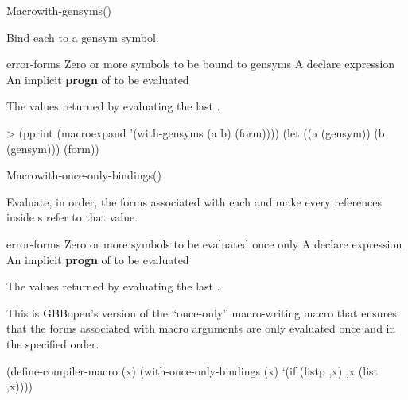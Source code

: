\documentclass[10pt,twoside,english,pdftex]{article}
\begin{document}
\begin{functiondoc}{Macro}{with-gensyms}{(\superstar{})
    \superstar{}
    \superstar{}
    \returns{} \superstar{}}
\fnsyntax

\fnpurpose Bind each  to a gensym symbol.

\fnpackage {}

\fnmodule {}

\fnargs
\begin{args}{error-forms}
\arg[symbols] Zero or more symbols to be bound to gensyms
\arg[declaration] A declare expression
\arg[forms] An implicit \textbf{progn} of  to be evaluated
\end{args}

\fnreturns The values returned by evaluating the last .

\fnexamples
%
\W\supp
\begin{example}
> (pprint (macroexpand '(with-gensyms (a b) (form))))
(let ((a (gensym))
      (b (gensym)))
  (form))
\end{example}

\end{functiondoc}


\begin{functiondoc}{Macro}{with-once-only-bindings}{(\superstar{})
    \superstar{}
    \superstar{} 
    \returns{} \superstar{}}

\fnsyntax

\fnpurpose Evaluate, in order, the forms associated with each 
and make every  references inside s refer to that
value.

\fnpackage {}

\fnmodule {}

\fnargs
\begin{args}{error-forms}
\arg[symbols] Zero or more symbols to be evaluated once only
\arg[declaration] A declare expression
\arg[forms] An implicit \textbf{progn} of  to be evaluated
\end{args}

\fnreturns The values returned by evaluating the last .

\fndescription This is GBBopen's version of the ``once-only'' macro-writing
macro that ensures that the forms associated with macro arguments are
only evaluated once and in the specified order.

%
\fnexample
%
\W\supp
\begin{example}
  (define-compiler-macro  (x)
    (with-once-only-bindings (x)
      `(if (listp ,x) ,x (list ,x))))
\end{example}

\end{functiondoc}
\end{document}
